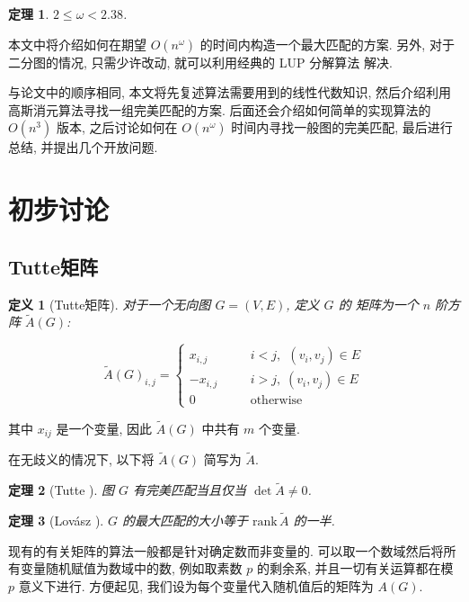 \documentclass[a4paper]{article}
\newtheorem*{definition}{\hspace{2em}定义}
\newtheorem{theorem}{\hspace{2em}定理}
\begin{document}
		\begin{theorem}
			$2 \le \omega < 2.38$.
		\end{theorem}

		本文中将介绍如何在期望 $O(n^\omega)$ 的时间内构造一个最大匹配的方案. 另外, 对于二分图的情况, 只需少许改动, 就可以利用经典的 LUP 分解算法 \cite{lu} 解决.

		与论文中的顺序相同, 本文将先复述算法需要用到的线性代数知识, 然后介绍利用高斯消元算法寻找一组完美匹配的方案. 后面还会介绍如何简单的实现算法的 $O(n^3)$ 版本, 之后讨论如何在 $O(n^\omega)$ 时间内寻找一般图的完美匹配, 最后进行总结, 并提出几个开放问题.
	
	\section{初步讨论}

		\subsection{Tutte矩阵}

			\begin{definition}[Tutte矩阵]
				对于一个无向图 $G=(V,E)$, 定义 $G$ 的  矩阵为一个 $n$ 阶方阵 $\tilde A(G)$:

				$$ \tilde A(G)_{i,j} = \left\{ \begin{aligned} x_{i,j} & \quad & i<j,\,\; (v_i, v_j)\in E \\ -x_{i,j} & \quad & i > j,\; (v_i, v_j) \in E \\ 0 & \quad & \text{otherwise}\end{aligned} \right. $$
			\end{definition}

			其中 $x_{ij}$ 是一个变量, 因此 $\tilde A(G)$ 中共有 $m$ 个变量.

			在无歧义的情况下, 以下将 $\tilde A(G)$ 简写为 $\tilde A$.

			\begin{theorem}[Tutte \cite{tuttetheorem}]
				图 $G$ 有完美匹配当且仅当 $\det \tilde A \neq 0$.
				\label{tutte}
			\end{theorem}

			\begin{theorem}[Lov\'asz \cite{lovasz}]
				$G$ 的最大匹配的大小等于 $\mathrm{rank}\, \tilde A$ 的一半.
			\end{theorem}

			现有的有关矩阵的算法一般都是针对确定数而非变量的. 可以取一个数域然后将所有变量随机赋值为数域中的数, 例如取素数 $p$ 的剩余系, 并且一切有关运算都在模 $p$ 意义下进行. 方便起见, 我们设为每个变量代入随机值后的矩阵为 $A(G)$.
\end{document}
